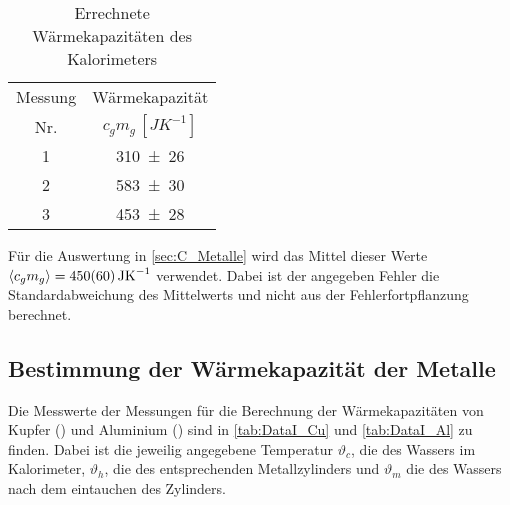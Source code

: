 	\begin{table}[!h]
		\centering
		\begin{tabular}{|c|c|}	
		\hline
			Messung   & Wärmekapazität\\
			Nr.		  & $c_{g}m_{g}\,[\si{JK^{-1}}]$\\ \hline \hline
			1& \num{310(26)}    \\    
			2& \num{583(30)}	  \\
			3& \num{453(28)}   \\
			\hline
		\end{tabular}
		\caption{Errechnete Wärmekapazitäten des Kalorimeters}
	\end{table}
	
	Für die Auswertung in \autoref{sec:C_Metalle} wird das Mittel
	dieser Werte $\mean{c_{g}m_{g}} = \SI{450(60)}{JK^{-1}}$ verwendet.
	Dabei ist der angegeben Fehler die Standardabweichung des Mittelwerts
	und nicht aus der Fehlerfortpflanzung berechnet.
	
	 
\subsection{Bestimmung der Wärmekapazität der Metalle}\label{sec:C_Metalle}
	
	Die Messwerte der Messungen für die Berechnung der Wärmekapazitäten 
	von Kupfer () und Aluminium () sind in \autoref{tab:DataI_Cu}
	und \ref{tab:DataI_Al} zu finden. Dabei ist die jeweilig angegebene Temperatur
	$\vartheta_{c}$, die des Wassers im Kalorimeter, $\vartheta_{h}$, die des
	entsprechenden Metallzylinders und $\vartheta_{m}$ die des Wassers nach dem
	eintauchen des Zylinders.    
	
